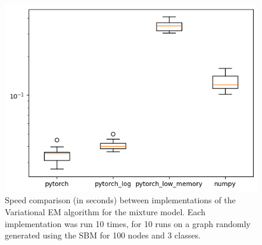 \documentclass[10pt]{article}
\begin{document}
\begin{figure}[h]
    \centering
    \includegraphics[width=0.8\linewidth]{speed_comparison_VEM.png}
    \caption{Speed comparison (in seconds) between implementations of the Variational EM algorithm for the mixture model. Each implementation was run 10 times, for 10 runs on a graph randomly generated using the SBM for 100 nodes and 3 classes.}
    \label{fig:speed_comparison}
\end{figure}



\end{document}
